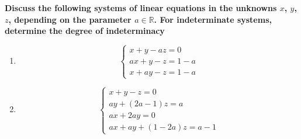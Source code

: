 
\item \textbf{Discuss the following systems
of linear equations in the unknowns
$x$, $y$, $z$, depending on the parameter
$a\in\mathbb{R}$. For indeterminate
systems, determine the degree of
indeterminacy}

\begin{enumerate}[label=\alph*)]

    \item
    $$
    \begin{cases}
        x+y-az=0\\
        ax+y-z=1-a\\
        x+ay-z=1-a
    \end{cases}
    $$

    

    \item
    $$
    \begin{cases}
        x+y-z=0\\
        ay+(2a-1)z=a\\
        ax+2ay=0\\
        ax+ay+(1-2a)z=a-1
    \end{cases}
    $$

    

\end{enumerate}
